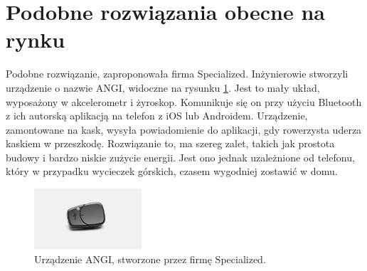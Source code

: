 \section{Podobne rozwiązania obecne na rynku}
Podobne rozwiązanie, zaproponowała firma Specialized. Inżynierowie stworzyli urządzenie o nazwie ANGI, widoczne na rysunku \ref{img:angi_img}. Jest to mały układ, wyposażony w akcelerometr i żyroskop. Komunikuje się on przy użyciu Bluetooth z ich autorską aplikacją na telefon z iOS lub Androidem. Urządzenie, zamontowane na kask, wysyła powiadomienie do aplikacji, gdy rowerzysta uderza kaskiem w przeszkodę. Rozwiązanie to, ma szereg zalet, takich jak prostota budowy i bardzo niskie zużycie energii. Jest ono jednak uzależnione od telefonu, który w przypadku wycieczek górskich, czasem wygodniej zostawić w domu.
\begin{figure}[h]
\includegraphics[width=4cm]{Graphics/angi.png}
\centering
\caption{Urządzenie ANGI, stworzone przez firmę Specialized.\cite{ANGI}}
\centering
\label{img:angi_img}
\end{figure}















